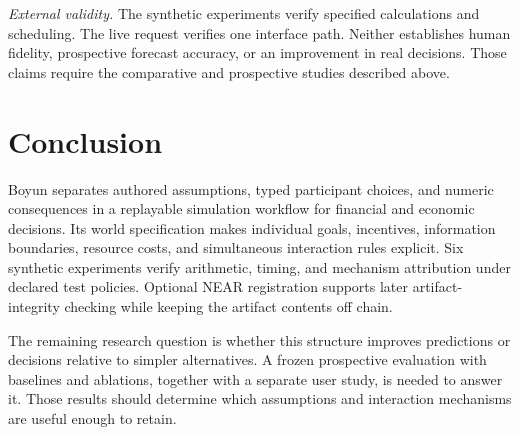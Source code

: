 \emph{External validity.} The synthetic experiments verify specified
calculations and scheduling. The live request verifies one interface path.
Neither establishes human fidelity, prospective forecast accuracy, or an
improvement in real decisions. Those claims require the comparative and
prospective studies described above.

\section{Conclusion}\label{sec:conclusion}
Boyun separates authored assumptions, typed participant choices, and numeric
consequences in a replayable simulation workflow for financial and economic decisions. Its world specification
makes individual goals, incentives, information boundaries, resource costs, and simultaneous
interaction rules explicit. Six synthetic experiments verify arithmetic,
timing, and mechanism attribution under declared test policies. Optional NEAR
registration supports later artifact-integrity checking while keeping the
artifact contents off chain.

The remaining research question is whether this structure improves predictions
or decisions relative to simpler alternatives. A frozen prospective evaluation
with baselines and ablations, together with a separate user study, is needed
to answer it. Those results should determine which assumptions and interaction
mechanisms are useful enough to retain.
